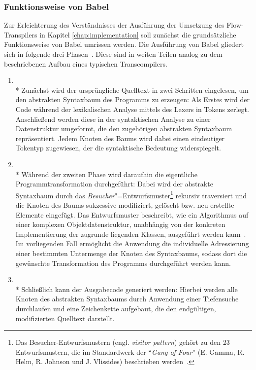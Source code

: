 \subsubsection{Funktionsweise von Babel}

Zur Erleichterung des Verständnisses der Ausführung der Umsetzung des Flow-Transpilers in Kapitel \ref{chap:implementation} soll zunächst die grundsätzliche Funktionsweise von Babel umrissen werden. Die Ausführung von Babel gliedert sich in folgende drei Phasen~\autocite{BABEL:HANDBOOK}. Diese sind in weiten Teilen analog zu dem beschriebenen Aufbau eines typischen Transcompilers.

\begin{enumerate}
  \item {}\\*
    Zunächst wird der ursprüngliche Quelltext in zwei Schritten eingelesen, um den abstrakten Syntaxbaum des Programms zu erzeugen: Als Erstes wird der Code während der lexikalischen Analyse mittels des Lexers in Tokens zerlegt. Anschließend werden diese in der syntaktischen Analyse zu einer Datenstruktur umgeformt, die den zugehörigen abstrakten Syntaxbaum repräsentiert. Jedem Knoten des Baums wird dabei einen eindeutiger Tokentyp zugewiesen, der die syntaktische Bedeutung widerspiegelt.
    \\

  \item {}\\*
    Während der zweiten Phase wird daraufhin die eigentliche Programmtransformation durchgeführt: Dabei wird der abstrakte Syntaxbaum durch das \emph{Besucher}"=Entwurfsmuster\footnote{Das Besucher-Entwurfsmustern (engl. \textit{visitor pattern}) gehört zu den 23 Entwurfsmustern, die im Standardwerk  der \enquote{\textit{Gang of Four}} (E. Gamma, R. Helm, R. Johnson und J. Vlissides) beschrieben werden~\autocite[306\psqq]{GAMMA:1994}.} rekursiv traversiert und die Knoten des Baums sukzessive modifiziert, gelöscht bzw. neu erstellte Elemente eingefügt. Das Entwurfsmuster beschreibt, wie ein Algorithmus auf einer komplexen Objektdatenstruktur, unabhängig von der konkreten Implementierung der zugrunde liegenden Klassen, ausgeführt werden kann~\autocite[634\psq]{FREEMAN:2004}. Im vorliegenden Fall ermöglicht die Anwendung die individuelle Adressierung einer bestimmten Untermenge der Knoten des Syntaxbaums, sodass dort die gewünschte Transformation des Programms durchgeführt werden kann.
    \\

  \item {}\\*
    Schließlich kann der Ausgabecode generiert werden: Hierbei werden alle Knoten des abstrakten Syntaxbaums durch Anwendung einer Tiefensuche durchlaufen und eine Zeichenkette aufgebaut, die den endgültigen, modifizierten Quelltext darstellt.
\end{enumerate}

